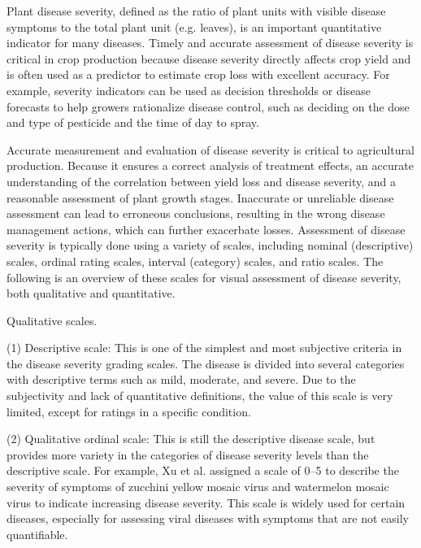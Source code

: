 Plant disease severity, defined as the ratio of plant units with visible disease symptoms to the total plant unit (e.g. leaves), is an important quantitative indicator for many diseases. Timely and accurate assessment of disease severity is critical in crop production because disease severity directly affects crop yield and is often used as a predictor to estimate crop loss with excellent accuracy. For example, severity indicators can be used as decision thresholds or disease forecasts to help growers rationalize disease control, such as deciding on the dose and type of pesticide and the time of day to spray.

Accurate measurement and evaluation of disease severity is critical to agricultural production. Because it ensures a correct analysis of treatment effects, an accurate understanding of the correlation between yield loss and disease severity, and a reasonable assessment of plant growth stages. Inaccurate or unreliable disease assessment can lead to erroneous conclusions, resulting in the wrong disease management actions, which can further exacerbate losses. Assessment of disease severity is typically done using a variety of scales, including nominal (descriptive) scales, ordinal rating scales, interval (category) scales, and ratio scales. The following is an overview of these scales for visual assessment of disease severity, both qualitative and quantitative.

Qualitative scales.

(1) Descriptive scale: This is one of the simplest and most subjective criteria in the disease severity grading scales. The disease is divided into several categories with descriptive terms such as mild, moderate, and severe. Due to the subjectivity and lack of quantitative definitions, the value of this scale is very limited, except for ratings in a specific condition.

(2) Qualitative ordinal scale: This is still the descriptive disease scale, but provides more variety in the categories of disease severity levels than the descriptive scale. For example, Xu et al. assigned a scale of 0–5 to describe the severity of symptoms of zucchini yellow mosaic virus and watermelon mosaic virus to indicate increasing disease severity. This scale is widely used for certain diseases, especially for assessing viral diseases with symptoms that are not easily quantifiable.

